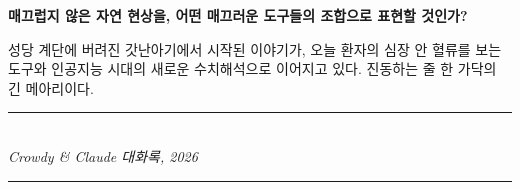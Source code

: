 \documentclass[11pt,a4paper]{article}
\begin{document}
\begin{quotebox}
\centering
\textbf{매끄럽지 않은 자연 현상을, 어떤 매끄러운 도구들의 조합으로 표현할 것인가?}
\end{quotebox}

성당 계단에 버려진 갓난아기에서 시작된 이야기가, 오늘 환자의 심장 안 혈류를 보는 도구와 인공지능 시대의 새로운 수치해석으로 이어지고 있다. 진동하는 줄 한 가닥의 긴 메아리이다.

\vfill
\begin{center}
\rule{0.5\textwidth}{0.4pt}\\
\vspace{0.3cm}
\textit{Crowdy \& Claude 대화록, 2026}\\
\vspace{0.3cm}
\rule{0.5\textwidth}{0.4pt}
\end{center}
\end{document}
